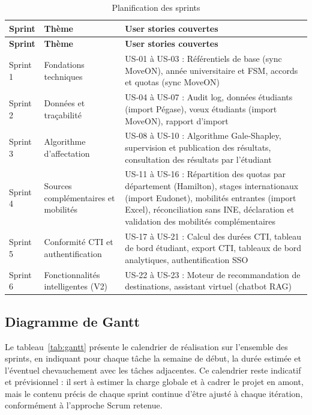 \begin{longtable}{|p{1.5cm}|p{4.5cm}|p{9.5cm}|}
\caption{Planification des sprints}
\label{tab:planif-sprints} \\
\hline
\rowcolor{gray!20}
\textbf{Sprint} & \textbf{Thème} & \textbf{User stories couvertes} \\
\hline
\endfirsthead

\hline
\rowcolor{gray!20}
\textbf{Sprint} & \textbf{Thème} & \textbf{User stories couvertes} \\
\hline
\endhead

Sprint 1 & Fondations techniques &
US-01 à US-03 : Référentiels de base (sync MoveON), année universitaire et FSM, accords et quotas (sync MoveON) \\
\hline

Sprint 2 & Données et traçabilité &
US-04 à US-07 : Audit log, données étudiants (import Pégase), vœux étudiants (import MoveON), rapport d’import \\
\hline

Sprint 3 & Algorithme d’affectation &
US-08 à US-10 : Algorithme Gale-Shapley, supervision et publication des résultats, consultation des résultats par l’étudiant \\
\hline

Sprint 4 & Sources complémentaires et mobilités &
US-11 à US-16 : Répartition des quotas par département (Hamilton), stages internationaux (import Eudonet), mobilités entrantes (import Excel), réconciliation sans INE, déclaration et validation des mobilités complémentaires \\
\hline

Sprint 5 & Conformité CTI et authentification &
US-17 à US-21 : Calcul des durées CTI, tableau de bord étudiant, export CTI, tableaux de bord analytiques, authentification SSO \\
\hline

Sprint 6 & Fonctionnalités intelligentes (V2) &
US-22 à US-23 : Moteur de recommandation de destinations, assistant virtuel (chatbot RAG) \\
\hline

\end{longtable}

\subsection{Diagramme de Gantt}

Le tableau~\ref{tab:gantt} présente le calendrier de réalisation sur l'ensemble des sprints, en indiquant pour chaque tâche la semaine de début, la durée estimée et l'éventuel chevauchement avec les tâches adjacentes. Ce calendrier reste indicatif et prévisionnel : il sert à estimer la charge globale et à cadrer le projet en amont, mais le contenu précis de chaque sprint continue d'être ajusté à chaque itération, conformément à l'approche Scrum retenue.

